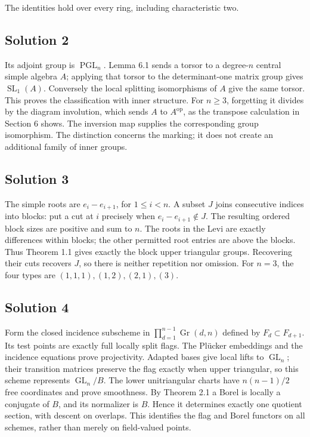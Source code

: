 \documentclass[11pt,a4paper,openany]{report}
\begin{document}
The identities hold over every ring, including characteristic two.

\subsection{Solution 2}\label{AG-RG-06-solution-2}

Its adjoint group is \(\operatorname{PGL}_n\). Lemma 6.1 sends a torsor to a degree-\(n\) central simple algebra \(A\); applying that torsor to the determinant-one matrix group gives \(\operatorname{SL}_1(A)\). Conversely the local splitting isomorphisms of \(A\) give the same torsor. This proves the classification with inner structure. For \(n\geq3\), forgetting it divides by the diagram involution, which sends \(A\) to \(A^{\mathrm{op}}\), as the transpose calculation in Section 6 shows. The inversion map supplies the corresponding group isomorphism. The distinction concerns the marking; it does not create an additional family of inner groups.

\subsection{Solution 3}\label{AG-RG-06-solution-3}

The simple roots are \(e_i-e_{i+1}\), for \(1\leq i<n\). A subset \(J\) joins consecutive indices into blocks: put a cut at \(i\) precisely when \(e_i-e_{i+1}\notin J\). The resulting ordered block sizes are positive and sum to \(n\). The roots in the Levi are exactly differences within blocks; the other permitted root entries are above the blocks. Thus Theorem 1.1 gives exactly the block upper triangular groups. Recovering their cuts recovers \(J\), so there is neither repetition nor omission. For \(n=3\), the four types are \((1,1,1),(1,2),(2,1),(3)\).

\subsection{Solution 4}\label{AG-RG-06-solution-4}

Form the closed incidence subscheme in \(\prod_{d=1}^{n-1}\operatorname{Gr}(d,n)\) defined by \(F_d\subset F_{d+1}\). Its test points are exactly full locally split flags. The Plücker embeddings and the incidence equations prove projectivity. Adapted bases give local lifts to \(\operatorname{GL}_n\); their transition matrices preserve the flag exactly when upper triangular, so this scheme represents \(\operatorname{GL}_n/B\). The lower unitriangular charts have \(n(n-1)/2\) free coordinates and prove smoothness. By Theorem 2.1 a Borel is locally a conjugate of \(B\), and its normalizer is \(B\). Hence it determines exactly one quotient section, with descent on overlaps. This identifies the flag and Borel functors on all schemes, rather than merely on field-valued points.
\end{document}
